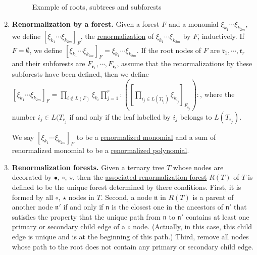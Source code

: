\begin{defn}
\begin{enumerate}
\begin{figure}[H]
{
    }
        \caption{Example of roots, subtrees and subforests}
        \label{fig.forests}
    \end{figure}
    \item \textbf{Renormalization by a forest.} Given a forest $F$ and a monomial $\xi_{k_1}\cdots \xi_{k_{2m}}$, we define $[\xi_{k_1}\cdots \xi_{k_{2m}}]_{F}$, the \underline{renormalization} of $\xi_{k_1}\cdots \xi_{k_{2m}}$ by $F$, inductively. If $F=\emptyset$, we define $[\xi_{k_1}\cdots \xi_{k_{2m}}]_{F}=\xi_{k_1}\cdots \xi_{k_{2m}}$. If the root nodes of $F$ are $\mathfrak{r}_1,\cdots, \mathfrak{r}_r$ and their subforests are $F_{\mathfrak{r}_1},\cdots, F_{\mathfrak{r}_r}$, assume that the renormalizations by these subforests have been defined, then we define $[\xi_{k_1}\cdots \xi_{k_{2m}}]_{F}=\prod_{i\notin L(F)} \xi_{k_i} \prod_{j=1}^r :\left(\left[\prod_{i_j\in L(T_{\mathfrak{r}_j})}\xi_{k_{i_j}}\right]_{F_{\mathfrak{r}_j}}\right):$, where the number $i_j\in L(T_{\mathfrak{r}_j}$ if and only if the leaf labelled by $i_j$ belongs to $L(T_{\mathfrak{r}_j})$.
    
    We say $[\xi_{k_1}\cdots \xi_{k_{2m}}]_{F}$ to be a \underline{renormalized monomial} and a sum of renormalized monomial to be a \underline{renormalized polynomial}. 
    \item \textbf{Renormalization forests.} Given a ternary tree $T$ whose nodes are decorated by $\bullet$, $\circ$, $\star$, then the \underline{associated renormalization forest} $R(T)$ of $T$ is defined to be the unique forest determined by there conditions. First, it is formed by all $\circ$, $\star$ nodes in $T$. Second, a node $\mathfrak{n}$ in $R(T)$ is a parent of another node $\mathfrak{n}'$ if and only if $\mathfrak{n}$ is the closest one in the ancestors of $\mathfrak{n}'$ that satisfies the property that the unique path from $\mathfrak{n}$ to $\mathfrak{n}'$ contains at least one primary or secondary child edge of a $\circ$ node. (Actually, in this case, this child edge is unique and is at the beginning of this path.)  Third, remove all nodes whose path to the root does not contain any primary or secondary child edge. 
    

\end{enumerate}
\end{defn}
